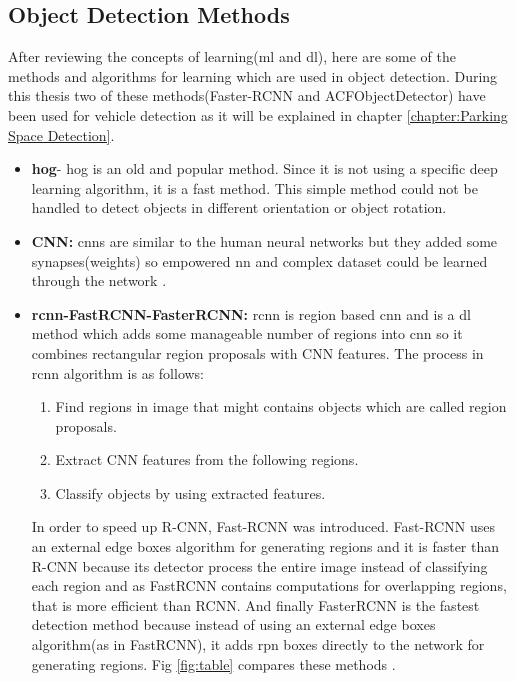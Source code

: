 \subsection{Object Detection Methods}
After reviewing the concepts of learning(\acrshort{ml} and \acrshort{dl}), here are some of the methods and algorithms for learning which are used in object detection. During this thesis two of these methods(Faster-RCNN and ACFObjectDetector) have been used for vehicle detection as it will be explained in chapter \ref{chapter:Parking Space Detection}.
\begin{itemize}
\item \textbf{\acrfull{hog}}-
 \acrshort{hog} is an old and popular method. Since it is not using a specific deep learning algorithm, it is a fast method. This simple method could not be handled to detect objects in different orientation or object rotation.
    \item \textbf{CNN:} \acrfull{cnn}s are similar to the human neural networks but they added some synapses(weights) so empowered \acrshort{nn} and complex dataset could be learned through the network \cite{CNN}.
    \item \textbf{\acrshort{rcnn}-FastRCNN-FasterRCNN:} \acrfull{rcnn} is region based \acrshort{cnn} and is a \acrshort{dl} method which adds some manageable number of regions into \acrshort{cnn} so it combines rectangular region proposals with CNN features. The process in \acrshort{rcnn} algorithm is as follows: \cite{RCNN-matlab}
    \begin{enumerate}
        \item Find regions in image that might contains objects which are called region proposals.
        \item Extract CNN features from the following regions.
        \item Classify objects by using extracted features.
    \end{enumerate}
    In order to speed up R-CNN, Fast-RCNN was introduced. Fast-RCNN uses an external edge boxes algorithm for generating regions and it is faster than R-CNN because its detector process the entire image instead of classifying each region and as FastRCNN contains computations for overlapping regions, that is more efficient than RCNN. And finally FasterRCNN is the fastest detection method because instead of using an external edge boxes algorithm(as in FastRCNN), it adds \acrfull{rpn} boxes directly to the network for generating regions. Fig \ref{fig:table} compares these methods \cite{RCNN-matlab}.

\end{itemize}
